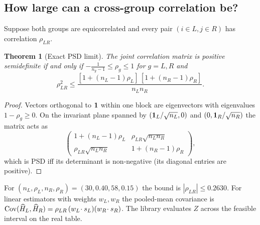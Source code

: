 \documentclass[11pt,a4paper]{article}
\newtheorem{theorem}{Theorem}
\theoremstyle{remark}\newtheorem{remark}{Remark}
\begin{document}
\subsection{How large can a cross-group correlation be?}
Suppose both groups are equicorrelated and every pair $(i\in L,j\in R)$ has correlation $\rho_{LR}$.
\begin{theorem}[Exact PSD limit]\label{thm:psd}
The joint correlation matrix is positive semidefinite if and only if $-\tfrac1{n_g-1}\le\rho_g\le1$ for $g=L,R$ and
\begin{equation}
\rho_{LR}^2\le\frac{[1+(n_L-1)\rho_L]\,[1+(n_R-1)\rho_R]}{n_Ln_R}.
\end{equation}
\end{theorem}
\begin{proof}
Vectors orthogonal to $\bm{1}$ within one block are eigenvectors with eigenvalues $1-\rho_g\ge0$. On the invariant plane spanned by $(\bm{1}_L/\sqrt{n_L},0)$ and $(0,\bm{1}_R/\sqrt{n_R})$ the matrix acts as
\[\begin{pmatrix}1+(n_L-1)\rho_L&\rho_{LR}\sqrt{n_Ln_R}\\\rho_{LR}\sqrt{n_Ln_R}&1+(n_R-1)\rho_R\end{pmatrix},\]
which is PSD iff its determinant is non-negative (its diagonal entries are positive).
\end{proof}
For $(n_L,\rho_L,n_R,\rho_R)=(30,0.40,58,0.15)$ the bound is $|\rho_{LR}|\le0.2630$. For linear estimators with weights $w_L,w_R$ the pooled-mean covariance is $\operatorname{Cov}(\widehat H_L,\widehat H_R)=\rho_{LR}\,(w_L\!\cdot s_L)(w_R\!\cdot s_R)$. The library evaluates $Z$ across the feasible interval on the real table.
\end{document}
